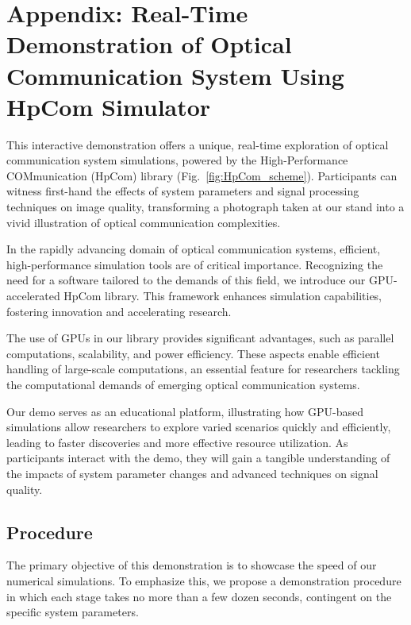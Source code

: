 \chapter{Appendix: Real-Time Demonstration of Optical Communication System Using HpCom Simulator}

This interactive demonstration offers a unique, real-time exploration of optical communication system simulations, powered by the High-Performance COMmunication (HpCom) library (Fig.~\ref{fig:HpCom_scheme}). Participants can witness first-hand the effects of system parameters and signal processing techniques on image quality, transforming a photograph taken at our stand into a vivid illustration of optical communication complexities.

In the rapidly advancing domain of optical communication systems, efficient, high-performance simulation tools are of critical importance. Recognizing the need for a software tailored to the demands of this field, we introduce our GPU-accelerated HpCom library\cite{esf0_2023_7880552}. This framework enhances simulation capabilities, fostering innovation and accelerating research.

The use of GPUs in our library provides significant advantages, such as parallel computations, scalability, and power efficiency. These aspects enable efficient handling of large-scale computations, an essential feature for researchers tackling the computational demands of emerging optical communication systems.

Our demo serves as an educational platform, illustrating how GPU-based simulations allow researchers to explore varied scenarios quickly and efficiently, leading to faster discoveries and more effective resource utilization. As participants interact with the demo, they will gain a tangible understanding of the impacts of system parameter changes and advanced techniques on signal quality.



\section{Procedure}

The primary objective of this demonstration is to showcase the speed of our numerical simulations. To emphasize this, we propose a demonstration procedure in which each stage takes no more than a few dozen seconds, contingent on the specific system parameters.


